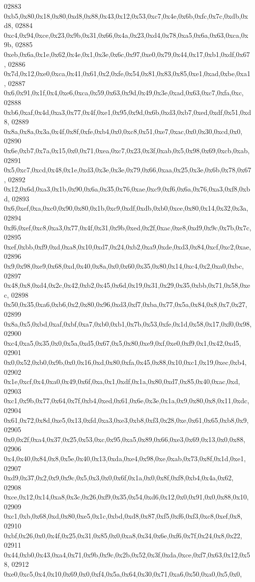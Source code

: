 \begin{DoxyCode}
02883   0xb5,0x80,0x18,0x80,0xd8,0x88,0x43,0x12,0x53,0xc7,0x4e,0x6b,0xfc,0x7c,0xdb,0xd8,
02884   0xc4,0x94,0xce,0x23,0x9b,0x31,0x66,0x4a,0x23,0xd4,0x78,0xa5,0x6a,0x63,0xca,0x9b,
02885   0xeb,0x6a,0x1e,0x62,0x4e,0x1,0x3e,0x6c,0x97,0xe0,0x79,0x44,0x17,0xb1,0xdf,0x67,
02886   0x7d,0x12,0xe0,0xca,0x41,0x61,0x2,0xfe,0x54,0x81,0x83,0x85,0xe1,0xad,0xbe,0xa1,
02887   0x6,0x91,0x1f,0x4,0xe6,0xca,0x59,0x63,0x9d,0x49,0x3e,0xad,0x63,0xc7,0xfa,0xc,
02888   0xb6,0xaf,0x4d,0xa3,0x77,0x4f,0xe1,0x95,0x9d,0x6b,0xd3,0xb7,0xed,0xdf,0x51,0xd8,
02889   0x8a,0x8a,0x3a,0x4f,0x8f,0xfe,0xb4,0x0,0xc8,0x51,0xe7,0xac,0x0,0x30,0xcd,0x0,
02890   0x6e,0xb7,0x7a,0x15,0x0,0x71,0xea,0xc7,0x23,0x3f,0xab,0x5,0x98,0x69,0xcb,0xab,
02891   0x5,0xc7,0xcd,0x48,0x1e,0xd3,0x3e,0x3e,0x79,0x66,0xaa,0x25,0x3e,0x6b,0x78,0x67,
02892   0x12,0x6d,0xa3,0x1b,0x90,0x6a,0x35,0x76,0xae,0xc9,0xf6,0x6a,0x76,0xa3,0xf8,0xbd,
02893   0x6,0xef,0xa,0xc0,0x90,0x80,0x1b,0xc9,0xdf,0xdb,0xb0,0xce,0x80,0x14,0x32,0x3a,
02894   0xf6,0xef,0xc8,0xa3,0x77,0x4f,0x31,0x9b,0xed,0x2f,0xac,0xe8,0xd9,0x9c,0x7b,0x7c,
02895   0xef,0xbb,0xf9,0xd,0xa8,0x10,0xd7,0x24,0xb2,0xa9,0xde,0xd3,0x84,0xcf,0xc2,0xae,
02896   0x9,0x98,0xe9,0x68,0xd,0x40,0x8a,0x0,0x60,0x35,0x80,0x14,0xc4,0x2,0xa0,0xbc,
02897   0x48,0x8,0xd4,0x2c,0x42,0xb2,0x45,0x6d,0x19,0x31,0x29,0x35,0xbb,0x71,0x58,0xec,
02898   0x50,0x35,0xa6,0xb6,0x2,0x80,0x96,0xd3,0xf7,0xba,0x77,0x5a,0x84,0x8,0x7,0x27,
02899   0x8a,0x5,0xbd,0xaf,0xbf,0xa7,0xb0,0xb1,0x7b,0x53,0xfe,0x1d,0x58,0x17,0xf0,0x98,
02900   0xc4,0xa5,0x35,0x0,0x5a,0xd5,0x67,0x5,0x80,0xe9,0xf,0xe0,0xf9,0x1,0x42,0xd5,
02901   0x0,0x52,0xb0,0x9b,0x0,0x16,0xd,0x80,0xfa,0x45,0x88,0x10,0xc1,0x19,0xec,0xb4,
02902   0x1e,0xcf,0x4,0xa0,0x49,0x6f,0xa,0x1,0xdf,0x1a,0x80,0xd7,0x85,0x40,0xac,0xd,
02903   0xc1,0x9b,0x77,0x64,0x7f,0xb4,0xed,0x61,0x6e,0x3e,0x1a,0x9,0x80,0x8,0x11,0xdc,
02904   0x61,0x72,0x8d,0xe5,0x13,0xfd,0xa3,0xe3,0xb8,0xf3,0x28,0xe,0x61,0x65,0xb8,0x9,
02905   0x0,0x2f,0xa4,0x37,0x25,0x53,0xc,0x95,0xa5,0x89,0x66,0xe3,0x69,0x13,0x0,0x88,
02906   0x4,0x40,0x84,0x8,0x5e,0x40,0x13,0xda,0xe4,0x98,0xe,0xab,0x73,0x8f,0x1d,0xe1,
02907   0xd9,0x37,0x2,0x9,0x9c,0x5,0x3,0x0,0x6f,0x1a,0x0,0x8f,0xf8,0xb4,0x4a,0x62,
02908   0xce,0x12,0x14,0xa8,0x3c,0x26,0xf9,0x35,0x54,0xd6,0x12,0x0,0x91,0x0,0x88,0x10,
02909   0xc1,0xb,0x68,0xd,0x80,0xe5,0x1c,0xbd,0xd8,0x87,0xf5,0xf6,0xf3,0xc8,0xef,0x8,
02910   0xbf,0x26,0x0,0x4f,0x25,0x31,0x85,0x0,0xa8,0x34,0x6e,0xf6,0x7f,0x24,0x8,0x22,
02911   0x44,0xb0,0x43,0xa4,0x71,0x9b,0x9c,0x2b,0x52,0x3f,0xda,0xce,0xf7,0x63,0x12,0x58,
02912   0xe0,0xc5,0x4,0x10,0x69,0x0,0xf4,0x5a,0x64,0x30,0x71,0xa6,0x50,0xa0,0x5,0x0,

\end{DoxyCode}
